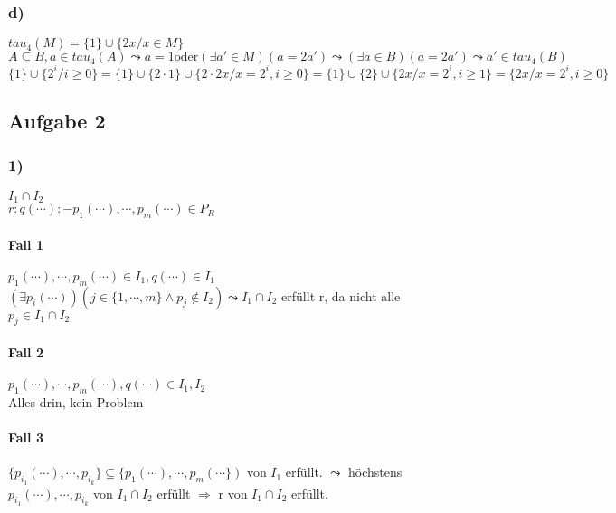 \documentclass[12pt, a4paper]{article}
\begin{document}
\subsubsection*{d)}
$tau_4(M) = \{ 1 \} \cup \{ 2x / x \in M \}$ \\
$A \subseteq B, a \in tau_4(A) \leadsto a = 1 \text{oder} (\exists a' \in M)(a = 2 a') \leadsto (\exists a \in B)(a = 2 a') \leadsto a' \in tau_4(B)$ \\
$\{ 1 \} \cup \{ 2^i / i \ge 0 \} = \{ 1 \} \cup \{ 2 \cdot 1 \} \cup \{2 \cdot 2x / x = 2^i, i \ge 0\} = \{ 1 \} \cup \{ 2 \} \cup \{ 2x / x = 2^i, i \ge 1 \} = \{ 2x / x = 2^i, i \ge 0 \}$


\subsection*{Aufgabe 2}

\subsubsection*{1)}
$I_1 \cap I_2$ \\
$r: q(\cdots) :- p_1(\cdots), \cdots, p_m(\cdots) \in P_R$ \\

\paragraph{Fall 1}
$p_1(\cdots), \cdots, p_m(\cdots) \in I_1, q(\cdots) \in I_1$ \\
$(\exists p_i(\cdots))(j \in \{ 1, \cdots, m \} \wedge p_j \not \in I_2) \leadsto I_1 \cap I_2$ erfüllt r, da nicht alle $p_j \in I_1 \cap I_2$ 

\paragraph{Fall 2}
$p_1(\cdots), \cdots, p_m(\cdots), q(\cdots) \in I_1, I_2$ \\
Alles drin, kein Problem

\paragraph{Fall 3}
$\{ p_{i_1}(\cdots), \cdots, p_{i_k} \} \subseteq \{ p_1(\cdots), \cdots, p_m(\cdots \})$ von $I_1$ erfüllt. $\leadsto$ höchstens $p_{i_1}(\cdots), \cdots, p_{i_k}$ von $I_1 \cap I_2$ erfüllt $\Rightarrow$ r von $I_1 \cap I_2$ erfüllt.\\
\end{document}
